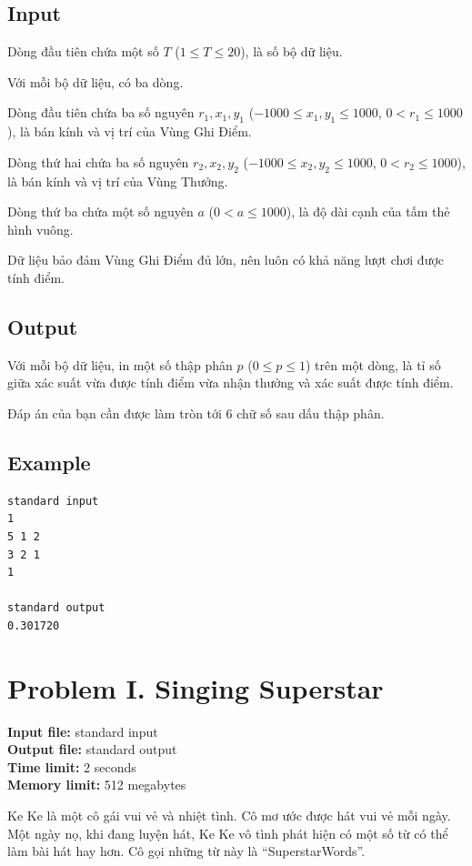 \documentclass[11pt]{article}
\begin{document}
\subsection*{Input}

Dòng đầu tiên chứa một số $T$ ($1\le T\le 20$), là số bộ dữ liệu.

Với mỗi bộ dữ liệu, có ba dòng.

Dòng đầu tiên chứa ba số nguyên $r_1,x_1,y_1$
($-1000\le x_1,y_1\le 1000$, $0<r_1\le 1000$), là bán kính và vị trí của
Vùng Ghi Điểm.

Dòng thứ hai chứa ba số nguyên $r_2,x_2,y_2$
($-1000\le x_2,y_2\le 1000$, $0<r_2\le 1000$), là bán kính và vị trí của Vùng
Thưởng.

Dòng thứ ba chứa một số nguyên $a$ ($0<a\le 1000$), là độ dài cạnh của tấm
thẻ hình vuông.

Dữ liệu bảo đảm Vùng Ghi Điểm đủ lớn, nên luôn có khả năng lượt chơi được
tính điểm.

\subsection*{Output}

Với mỗi bộ dữ liệu, in một số thập phân $p$ ($0\le p\le 1$) trên một dòng, là
tỉ số giữa xác suất vừa được tính điểm vừa nhận thưởng và xác suất được tính
điểm.

Đáp án của bạn cần được làm tròn tới $6$ chữ số sau dấu thập phân.

\subsection*{Example}

\begin{verbatim}
standard input
1
5 1 2
3 2 1
1

standard output
0.301720
\end{verbatim}

\section{Problem I. Singing Superstar}

\noindent
\textbf{Input file:} standard input\\
\textbf{Output file:} standard output\\
\textbf{Time limit:} 2 seconds\\
\textbf{Memory limit:} 512 megabytes

Ke Ke là một cô gái vui vẻ và nhiệt tình. Cô mơ ước được hát vui vẻ mỗi ngày.
Một ngày nọ, khi đang luyện hát, Ke Ke vô tình phát hiện có một số từ có thể
làm bài hát hay hơn. Cô gọi những từ này là ``SuperstarWords''.
\end{document}
